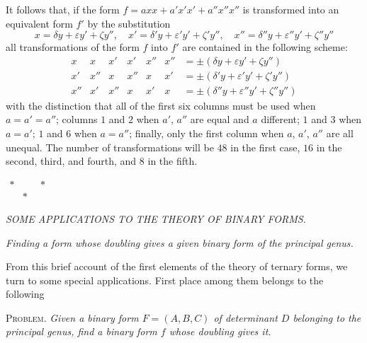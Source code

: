 It follows that, if the form $f=axx+a'x'x'+a''x''x''$ is transformed into an equivalent
form $f'$ by the substitution
\[
x=\delta y+\varepsilon y'+\zeta y'',\quad x'=\delta'y+\varepsilon'y'+\zeta'y'',\quad x''=\delta''y+\varepsilon''y'+\zeta''y''
\]
all transformations of the form $f$ into $f'$ are contained
in the following scheme:
\[
\begin{array}{c|c|c|c|c|c|l}
x&x&x'&x'&x''&x''&=\pm(\delta y+\varepsilon y'+\zeta y'')\\
x'&x''&x&x''&x&x'&=\pm(\delta'y+\varepsilon'y'+\zeta'y'')\\
x''&x'&x''&x&x'&x&=\pm(\delta''y+\varepsilon''y'+\zeta''y'')
\end{array}
\]
with the distinction that all of the first six columns must be used when $a=a'=a''$;
columns $1$ and $2$ when $a'$, $a''$ are equal and $a$
different; $1$ and $3$ when $a=a'$; $1$ and $6$ when
$a=a''$; finally, only the first column when $a$, $a'$, $a''$
are all unequal. The number of transformations will be $48$ in the
first case, $16$ in the second, third, and fourth, and $8$ in the fifth.

\begin{center}
$\begin{array}{ccc}*&\quad&*\\&*&\end{array}$
\end{center}

\begin{center}
\textit{SOME APPLICATIONS TO THE THEORY OF BINARY FORMS.}
\end{center}

\begin{center}
\textit{Finding a form whose doubling gives a given binary form of the principal genus.}
\end{center}

From this brief account of the first elements of the theory of ternary
forms, we turn to some special applications. First place among them
belongs to the following

\textsc{Problem.} \textit{Given a binary form $F=(A,B,C)$ of determinant
$D$ belonging to the principal genus, find a binary form $f$
whose doubling gives it.}

